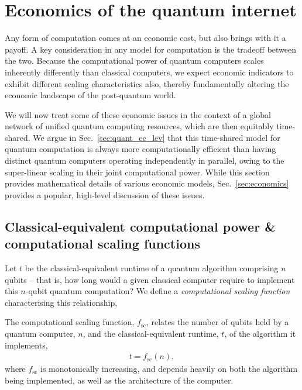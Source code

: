 %
%

\section{Economics of the quantum internet} 

Any form of computation comes at an economic cost, but also brings with it a payoff. A key consideration in any model for computation is the tradeoff between the two. Because the computational power of quantum computers scales inherently differently than classical computers, we expect economic indicators to exhibit different scaling characteristics also, thereby fundamentally altering the economic landscape of the post-quantum world.

We will now treat some of these economic issues in the context of a global network of unified quantum computing resources, which are then equitably time-shared. We argue in Sec.~\ref{sec:quant_ec_lev} that this time-shared model for quantum computation is always more computationally efficient than having distinct quantum computers operating independently in parallel, owing to the super-linear scaling in their joint computational power. While this section provides mathematical details of various economic models, Sec.~\ref{sec:economics} provides a popular, high-level discussion of these issues.


%
%

\subsection{Classical-equivalent computational power \& computational scaling functions}

Let $t$ be the classical-equivalent runtime of a quantum algorithm comprising $n$ qubits -- that is, how long would a given classical computer require to implement this $n$-qubit quantum computation? We define a \textit{computational scaling function} characterising this relationship,

\begin{definition} \label{def:scaling_func} 
The computational scaling function, $f_\text{sc}$, relates the number of qubits held by a quantum computer, $n$, and the classical-equivalent runtime, $t$, of the algorithm it implements,
\begin{align}
t = f_\text{sc}(n),
\end{align}
	where $f_\text{sc}$ is monotonically increasing, and depends heavily on both the algorithm being implemented, as well as the architecture of the computer.
\end{definition}

